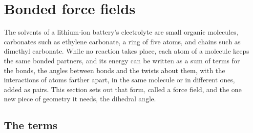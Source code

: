 \section{Bonded force fields}
\label{sec:pe-bonded}

The solvents of a lithium-ion battery's electrolyte are small organic
molecules, carbonates such as ethylene carbonate, a ring of five atoms,
and chains such as dimethyl carbonate. While no reaction takes place, each
atom of a molecule keeps the same bonded partners, and its energy can be
written as a sum of terms for the bonds, the angles between bonds and the
twists about them, with the interactions of atoms farther apart, in the
same molecule or in different ones, added as pairs.
This section sets out that form, called a force field, and the one new
piece of geometry it needs, the dihedral angle.

\subsection*{The terms}

